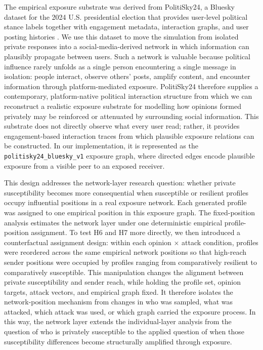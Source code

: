 \documentclass[11pt,a4paper]{article}
\begin{document}
The empirical exposure substrate was derived from PolitiSky24, a Bluesky dataset for the 2024 U.S.
presidential election that provides user-level political stance labels together with engagement
metadata, interaction graphs, and user posting histories \citep{rostami2025politisky24}. We use
this dataset to move the simulation from isolated private responses into a social-media-derived
network in which information can plausibly propagate between users. Such a network is valuable
because political influence rarely unfolds as a single person encountering a single message in
isolation: people interact, observe others' posts, amplify content, and encounter information
through platform-mediated exposure. PolitiSky24 therefore supplies a contemporary, platform-native
political interaction structure from which we can reconstruct a realistic exposure substrate for
modelling how opinions formed privately may be reinforced or attenuated by surrounding social
information. This substrate does not directly observe what every user read; rather, it provides
engagement-based interaction traces from which plausible exposure relations can be constructed. In
our implementation, it is represented as the \texttt{politisky24\_bluesky\_v1} exposure graph,
where directed edges encode plausible exposure from a visible peer to an exposed receiver.

This design addresses the network-layer research question: whether private susceptibility becomes
more consequential when susceptible or resilient profiles occupy influential positions in a real
exposure network. Each generated profile was assigned to one empirical position in this exposure
graph. The fixed-position analysis estimates the network layer under one deterministic empirical
profile-position assignment. To test H6 and H7 more directly, we then introduced a counterfactual
assignment design: within each opinion $\times$ attack condition, profiles were reordered across
the same empirical network positions so that high-reach sender positions were occupied by profiles
ranging from comparatively resilient to comparatively susceptible. This manipulation changes the
alignment between private susceptibility and sender reach, while holding the profile set, opinion
targets, attack vectors, and empirical graph fixed. It therefore isolates the network-position
mechanism from changes in who was sampled, what was attacked, which attack was used, or which graph
carried the exposure process. In this way, the network layer extends the individual-layer analysis
from the question of who is privately susceptible to the applied question of when those
susceptibility differences become structurally amplified through exposure.
\end{document}
